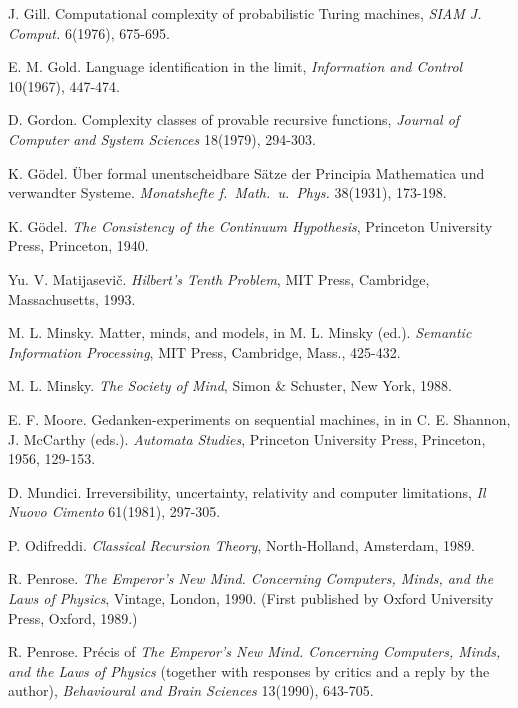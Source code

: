 \begin{thebibliography}{99999}
J. Gill. Computational complexity of probabilistic Turing machines,
{\it SIAM J. Comput.} 6(1976), 675-695.

 E. M. Gold. Language identification in the limit, {\it Information and
Control} 10(1967),  447-474.



 D. Gordon. Complexity classes of provable recursive functions,
{\it Journal of Computer and System Sciences} 18(1979), 294-303.

 K.  G\"odel.
\"Uber formal unentscheidbare S\"atze der Principia Mathematica
und verwandter Systeme. {\it Monatshefte f.\ Math.\ u.\ Phys.\/}
38(1931), 173-198.

K. G\"{o}del. {\em The Consistency of the Continuum Hypothesis}, Princeton
University Press, Princeton, 1940.


Yu. V. Matijasevi\v{c}.  {\em Hilbert's
Tenth Problem}, MIT Press, Cambridge, Massachusetts, 1993.


 M. L. Minsky. Matter, minds, and models, in M. L. Minsky (ed.).
{\it Semantic Information Processing}, MIT Press, Cambridge, Mass., 425-432.


M. L. Minsky. {\it The Society of Mind}, Simon \&
Schuster, New York,
1988.


 E. F. Moore.   Gedanken-experiments on sequential machines, in
 in C. E. Shannon, J. McCarthy (eds.). {\it
Automata Studies}, Princeton University Press, Princeton, 1956, 129-153.

  D. Mundici. Irreversibility, uncertainty, relativity and
computer limitations, {\it Il Nuovo Cimento} 61(1981), 297-305.

P. Odifreddi.  {\it Classical Recursion Theory},
North-Holland, Amsterdam, 1989.


 R. Penrose. {\em The Emperor's New Mind. Concerning Computers, Minds, and
 the Laws of Physics}, Vintage,  London, 1990. (First published by
Oxford University Press, Oxford, 1989.)

 R. Penrose. Pr\'{e}cis of {\em The Emperor's New Mind.
Concerning Computers, Minds, and
 the Laws of Physics} (together with responses by critics and a reply by
 the author), {\em Behavioural and Brain Sciences} 13(1990), 643-705.





\end{thebibliography}
